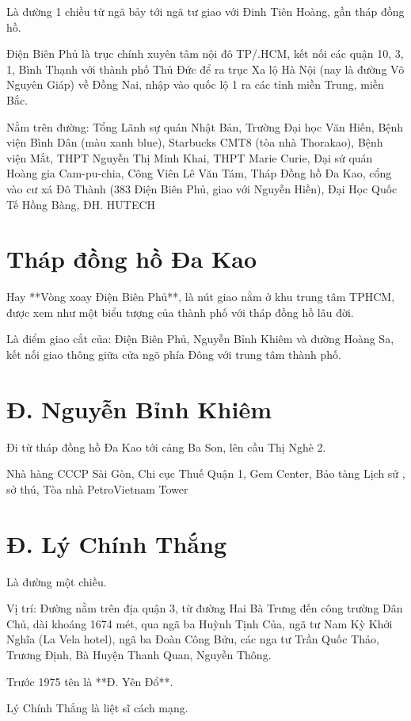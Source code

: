 Là đường 1 chiều từ ngã bảy tới ngã tư giao với Đinh Tiên Hoàng, gần tháp đồng hồ.

Điện Biên Phủ là trục chính xuyên tâm nội đô TP/.HCM, kết nối các quận 10, 3, 1, Bình Thạnh với thành phố Thủ Đức để ra trục Xa lộ Hà Nội (nay là đường Võ Nguyên Giáp) về Đồng Nai, nhập vào quốc lộ 1 ra các tỉnh miền Trung, miền Bắc.

Nằm trên đường: Tổng Lãnh sự quán Nhật Bản, Trường Đại học Văn Hiến, Bệnh viện Bình Dân (màu xanh blue), Starbucks CMT8 (tòa nhà Thorakao), Bệnh viện Mắt, THPT Nguyễn Thị Minh Khai, THPT Marie Curie, Đại sứ quán Hoàng gia Cam-pu-chia, Công Viên Lê Văn Tám, Tháp Đồng hồ Đa Kao, cổng vào cư xá Đô Thành (383 Điện Biên Phủ, giao với Nguyễn Hiền), Đại Học Quốc Tế Hồng Bàng, ĐH. HUTECH

\section{Tháp đồng hồ Đa Kao}

Hay **Vòng xoay Điện Biên Phủ**, là nút giao nằm ở khu trung tâm TPHCM, được xem như một biểu tượng của thành phố với tháp đồng hồ lâu đời.

Là điểm giao cắt của: Điện Biên Phủ, Nguyễn Bỉnh Khiêm và đường Hoàng Sa, kết nối giao thông giữa cửa ngõ phía Đông với trung tâm thành phố.

\section{Đ. Nguyễn Bỉnh Khiêm}

Đi từ tháp đồng hồ Đa Kao tới cảng Ba Son, lên cầu Thị Nghè 2.

Nhà hàng CCCP Sài Gòn, Chi cục Thuế Quận 1, Gem Center, Bảo tàng Lịch sử , sở thú, Tòa nhà PetroVietnam Tower


\section{Đ. Lý Chính Thắng}

Là đường một chiều.

Vị trí: Đường nằm trên địa quận 3, từ đường Hai Bà Trưng đến công trường Dân Chủ, dài khoáng 1674 mét, qua ngã ba Huỳnh Tịnh Của, ngã tư Nam Kỳ Khởi Nghĩa (La Vela hotel), ngã ba Đoàn Công Bửu, các nga tư Trần Quốc Thảo, Trương Định, Bà Huyện Thanh Quan, Nguyễn Thông.

Trước 1975 tên là **Đ. Yên Đổ**.

Lý Chính Thắng là liệt sĩ cách mạng.

